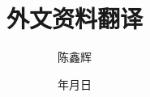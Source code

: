 \documentclass[WordOneHalf,mac]{XDUthesis}   %
\title{外文资料翻译}
\author{陈鑫辉}
\date{\qquad 年\qquad 月\qquad 日} %
\begin{document}


\makeatletter
\XDU@setpdf@keywords
%
\makeatother

\maketitle



% 


% 
\end{document}
